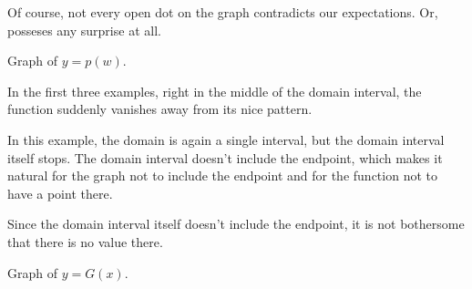 \documentclass{ximera}
\begin{document}
Of course, not every open dot on the graph contradicts our expectations. Or, posseses any surprise at all.






Graph of $y = p(w)$.

\begin{image}
\end{image}








In the first three examples, right in the middle of the domain interval, the function suddenly vanishes away from its nice pattern. 

In this example, the domain is again a single interval, but the domain interval itself stops. The domain interval doesn’t include the endpoint, which makes it natural for the graph not to include the endpoint and for the function not to have a point there.

Since the domain interval itself doesn't include the endpoint, it is not bothersome that there is no value there.








 
Graph of $y = G(x)$.
 
\end{document}
